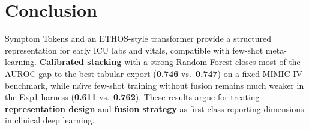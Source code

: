 \section{Conclusion}
\label{sec:conc}

Symptom Tokens and an ETHOS-style transformer provide a structured representation for early ICU labs and vitals, compatible with few-shot meta-learning. \textbf{Calibrated stacking} with a strong Random Forest closes most of the AUROC gap to the best tabular export (\textbf{0.746} vs.\ \textbf{0.747}) on a fixed MIMIC-IV benchmark, while na\"{\i}ve few-shot training without fusion remains much weaker in the Exp1 harness (\textbf{0.611} vs.\ \textbf{0.762}). These results argue for treating \textbf{representation design} and \textbf{fusion strategy} as first-class reporting dimensions in clinical deep learning.
